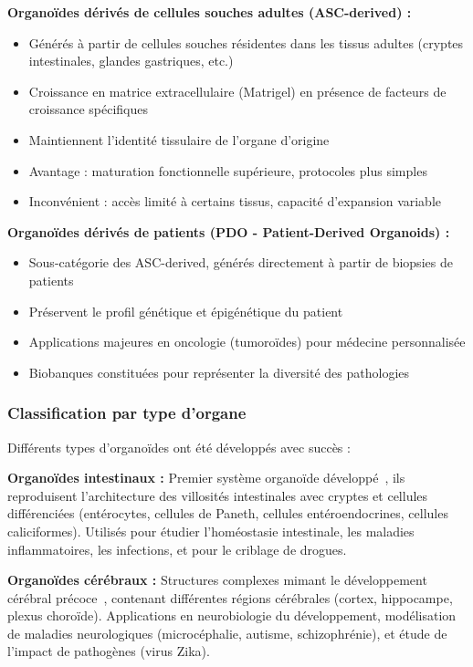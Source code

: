 \textbf{Organoïdes dérivés de cellules souches adultes (ASC-derived) :}
\begin{itemize}
    \item Générés à partir de cellules souches résidentes dans les tissus adultes (cryptes intestinales, glandes gastriques, etc.)
    \item Croissance en matrice extracellulaire (Matrigel) en présence de facteurs de croissance spécifiques
    \item Maintiennent l'identité tissulaire de l'organe d'origine
    \item Avantage : maturation fonctionnelle supérieure, protocoles plus simples
    \item Inconvénient : accès limité à certains tissus, capacité d'expansion variable
\end{itemize}

\textbf{Organoïdes dérivés de patients (PDO - Patient-Derived Organoids) :}
\begin{itemize}
    \item Sous-catégorie des ASC-derived, générés directement à partir de biopsies de patients
    \item Préservent le profil génétique et épigénétique du patient
    \item Applications majeures en oncologie (tumoroïdes) pour médecine personnalisée
    \item Biobanques constituées pour représenter la diversité des pathologies
\end{itemize}

\subsubsection{Classification par type d'organe}

Différents types d'organoïdes ont été développés avec succès :

\textbf{Organoïdes intestinaux :}
Premier système organoïde développé~\cite{Sato2009}, ils reproduisent l'architecture des villosités intestinales avec cryptes et cellules différenciées (entérocytes, cellules de Paneth, cellules entéroendocrines, cellules caliciformes). Utilisés pour étudier l'homéostasie intestinale, les maladies inflammatoires, les infections, et pour le criblage de drogues.

\textbf{Organoïdes cérébraux :}
Structures complexes mimant le développement cérébral précoce~\cite{Lancaster2013}, contenant différentes régions cérébrales (cortex, hippocampe, plexus choroïde). Applications en neurobiologie du développement, modélisation de maladies neurologiques (microcéphalie, autisme, schizophrénie), et étude de l'impact de pathogènes (virus Zika).


